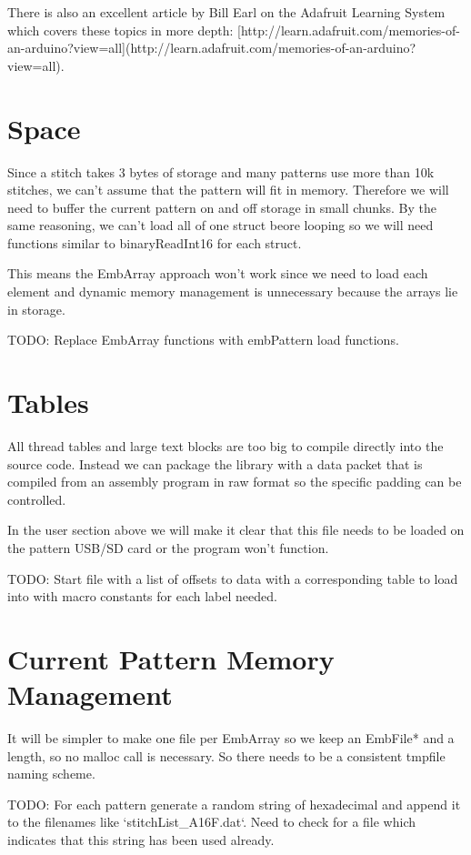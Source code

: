\documentclass{report}
\begin{document}
There is also an excellent article by Bill Earl on the Adafruit Learning
System which covers these topics in more depth:
[http://learn.adafruit.com/memories-of-an-arduino?view=all](http://learn.adafruit.com/memories-of-an-arduino?view=all).

\section{Space}

Since a stitch takes 3 bytes of storage and many patterns use more than
10k stitches, we can't assume that the pattern will fit in memory. Therefore
we will need to buffer the current pattern on and off storage in small
chunks. By the same reasoning, we can't load all of one struct beore
looping so we will need functions similar to binaryReadInt16 for each
struct.

This means the EmbArray approach won't work since we need to load
each element and dynamic memory management is unnecessary because
the arrays lie in storage.

TODO: Replace EmbArray functions with embPattern load functions.

\section{Tables}

All thread tables and large text blocks are too big to compile directly
into the source code. Instead we can package the library with a data packet
that is compiled from an assembly program in raw format so the specific
padding can be controlled.

In the user section above we will make it clear that this file
needs to be loaded on the pattern USB/SD card or the program won't function.

TODO: Start file with a list of offsets to data with a corresponding table
to load into with macro constants for each label needed.

\section{Current Pattern Memory Management}

It will be simpler to make one file per EmbArray so we keep an EmbFile*
and a length, so no malloc call is necessary. So there needs to be a consistent
tmpfile naming scheme.

TODO: For each pattern generate a random string of hexadecimal and append it
to the filenames like `stitchList\_A16F.dat`. Need to check for a file
which indicates that this string has been used already.
\end{document}

